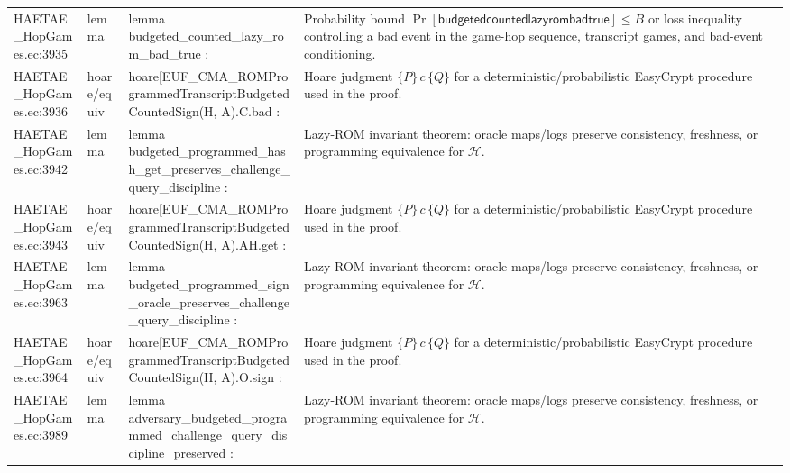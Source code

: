 \documentclass[10pt]{article}
\begin{document}
\begin{longtable}{L{0.11\textwidth}L{0.055\textwidth}L{0.385\textwidth}L{0.41\textwidth}}
HAETAE\_\allowbreak{}HopGames.\allowbreak{}ec:\allowbreak{}3935 & lemma & {\ttfamily\scriptsize lemma budgeted\_\allowbreak{}counted\_\allowbreak{}lazy\_\allowbreak{}rom\_\allowbreak{}bad\_\allowbreak{}true :} & Probability bound $\Pr[\mathsf{budgetedcountedlazyrombadtrue}]\le B$ or loss inequality controlling a bad event in the game-hop sequence, transcript games, and bad-event conditioning. \\
HAETAE\_\allowbreak{}HopGames.\allowbreak{}ec:\allowbreak{}3936 & hoare/equiv & {\ttfamily\scriptsize hoare[EUF\_\allowbreak{}CMA\_\allowbreak{}ROMProgrammedTranscriptBudgetedCountedSign(H, A).C.bad :} & Hoare judgment $\{P\}\,c\,\{Q\}$ for a deterministic/probabilistic EasyCrypt procedure used in the proof. \\
HAETAE\_\allowbreak{}HopGames.\allowbreak{}ec:\allowbreak{}3942 & lemma & {\ttfamily\scriptsize lemma budgeted\_\allowbreak{}programmed\_\allowbreak{}hash\_\allowbreak{}get\_\allowbreak{}preserves\_\allowbreak{}challenge\_\allowbreak{}query\_\allowbreak{}discipline :} & Lazy-ROM invariant theorem: oracle maps/logs preserve consistency, freshness, or programming equivalence for $\mathcal H$. \\
HAETAE\_\allowbreak{}HopGames.\allowbreak{}ec:\allowbreak{}3943 & hoare/equiv & {\ttfamily\scriptsize hoare[EUF\_\allowbreak{}CMA\_\allowbreak{}ROMProgrammedTranscriptBudgetedCountedSign(H, A).AH.get :} & Hoare judgment $\{P\}\,c\,\{Q\}$ for a deterministic/probabilistic EasyCrypt procedure used in the proof. \\
HAETAE\_\allowbreak{}HopGames.\allowbreak{}ec:\allowbreak{}3963 & lemma & {\ttfamily\scriptsize lemma budgeted\_\allowbreak{}programmed\_\allowbreak{}sign\_\allowbreak{}oracle\_\allowbreak{}preserves\_\allowbreak{}challenge\_\allowbreak{}query\_\allowbreak{}discipline :} & Lazy-ROM invariant theorem: oracle maps/logs preserve consistency, freshness, or programming equivalence for $\mathcal H$. \\
HAETAE\_\allowbreak{}HopGames.\allowbreak{}ec:\allowbreak{}3964 & hoare/equiv & {\ttfamily\scriptsize hoare[EUF\_\allowbreak{}CMA\_\allowbreak{}ROMProgrammedTranscriptBudgetedCountedSign(H, A).O.sign :} & Hoare judgment $\{P\}\,c\,\{Q\}$ for a deterministic/probabilistic EasyCrypt procedure used in the proof. \\
HAETAE\_\allowbreak{}HopGames.\allowbreak{}ec:\allowbreak{}3989 & lemma & {\ttfamily\scriptsize lemma adversary\_\allowbreak{}budgeted\_\allowbreak{}programmed\_\allowbreak{}challenge\_\allowbreak{}query\_\allowbreak{}discipline\_\allowbreak{}preserved :} & Lazy-ROM invariant theorem: oracle maps/logs preserve consistency, freshness, or programming equivalence for $\mathcal H$. \\

\end{longtable}
\end{document}
